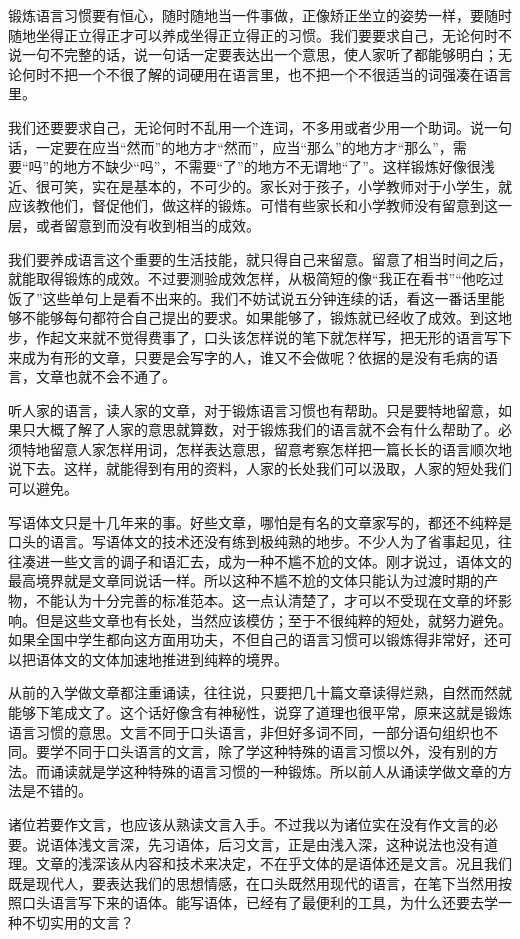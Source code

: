 \documentclass[fontset=fandol,12pt,a5paper]{ctexbook}
\begin{document}
锻炼语言习惯要有恒心，随时随地当一件事做，正像矫正坐立的姿势一样，要随时随地坐得正立得正才可以养成坐得正立得正的习惯。我们要要求自己，无论何时不说一句不完整的话，说一句话一定要表达出一个意思，使人家听了都能够明白；无论何时不把一个不很了解的词硬用在语言里，也不把一个不很适当的词强凑在语言里。

我们还要要求自己，无论何时不乱用一个连词，不多用或者少用一个助词。说一句话，一定要在应当“然而”的地方才“然而”，应当“那么”的地方才“那么”，需要“吗”的地方不缺少“吗”，不需要“了”的地方不无谓地“了”。这样锻炼好像很浅近、很可笑，实在是基本的，不可少的。家长对于孩子，小学教师对于小学生，就应该教他们，督促他们，做这样的锻炼。可惜有些家长和小学教师没有留意到这一层，或者留意到而没有收到相当的成效。

我们要养成语言这个重要的生活技能，就只得自己来留意。留意了相当时间之后，就能取得锻炼的成效。不过要测验成效怎样，从极简短的像“我正在看书”“他吃过饭了”这些单句上是看不出来的。我们不妨试说五分钟连续的话，看这一番话里能够不能够每句都符合自己提出的要求。如果能够了，锻炼就已经收了成效。到这地步，作起文来就不觉得费事了，口头该怎样说的笔下就怎样写，把无形的语言写下来成为有形的文章，只要是会写字的人，谁又不会做呢？依据的是没有毛病的语言，文章也就不会不通了。

听人家的语言，读人家的文章，对于锻炼语言习惯也有帮助。只是要特地留意，如果只大概了解了人家的意思就算数，对于锻炼我们的语言就不会有什么帮助了。必须特地留意人家怎样用词，怎样表达意思，留意考察怎样把一篇长长的语言顺次地说下去。这样，就能得到有用的资料，人家的长处我们可以汲取，人家的短处我们可以避免。

写语体文只是十几年来的事。好些文章，哪怕是有名的文章家写的，都还不纯粹是口头的语言。写语体文的技术还没有练到极纯熟的地步。不少人为了省事起见，往往凑进一些文言的调子和语汇去，成为一种不尴不尬的文体。刚才说过，语体文的最高境界就是文章同说话一样。所以这种不尴不尬的文体只能认为过渡时期的产物，不能认为十分完善的标准范本。这一点认清楚了，才可以不受现在文章的坏影响。但是这些文章也有长处，当然应该模仿；至于不很纯粹的短处，就努力避免。如果全国中学生都向这方面用功夫，不但自己的语言习惯可以锻炼得非常好，还可以把语体文的文体加速地推进到纯粹的境界。

从前的入学做文章都注重诵读，往往说，只要把几十篇文章读得烂熟，自然而然就能够下笔成文了。这个话好像含有神秘性，说穿了道理也很平常，原来这就是锻炼语言习惯的意思。文言不同于口头语言，非但好多词不同，一部分语句组织也不同。要学不同于口头语言的文言，除了学这种特殊的语言习惯以外，没有别的方法。而诵读就是学这种特殊的语言习惯的一种锻炼。所以前人从诵读学做文章的方法是不错的。

诸位若要作文言，也应该从熟读文言入手。不过我以为诸位实在没有作文言的必要。说语体浅文言深，先习语体，后习文言，正是由浅入深，这种说法也没有道理。文章的浅深该从内容和技术来决定，不在乎文体的是语体还是文言。况且我们既是现代人，要表达我们的思想情感，在口头既然用现代的语言，在笔下当然用按照口头语言写下来的语体。能写语体，已经有了最便利的工具，为什么还要去学一种不切实用的文言？
\end{document}
